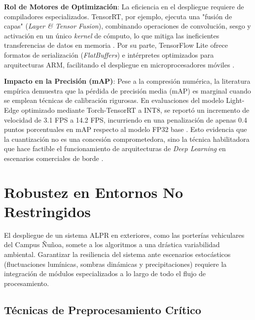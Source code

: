 \textbf{Rol de Motores de Optimización}: 
La eficiencia en el despliegue requiere de compiladores especializados. 
TensorRT, por ejemplo, ejecuta una "fusión de capas" (\textit{Layer \& Tensor Fusion}), 
combinando operaciones de convolución, sesgo y activación en un único \textit{kernel} de 
cómputo, lo que mitiga las ineficientes transferencias de datos en memoria 
\parencite{ammarMultiStageDeepLearningBasedVehicle2023, sonnaraEfficientRealtimeLicense2025}. 
Por su parte, TensorFlow Lite ofrece formatos de serialización (\textit{FlatBuffers}) e 
intérpretes optimizados para arquitecturas ARM, facilitando el despliegue en microprocesadores 
móviles \parencite{swatiEfficientDeepLearning2024}.

\textbf{Impacto en la Precisión (mAP)}: 
Pese a la compresión numérica, la literatura empírica demuestra que la pérdida de 
precisión media (mAP) es marginal cuando se emplean técnicas de calibración rigurosas. 
En evaluaciones del modelo Light-Edge optimizado mediante Torch-TensorRT a INT8, se 
reportó un incremento de velocidad de 3.1 FPS a 14.2 FPS, incurriendo en una penalización 
de apenas 0.4 puntos porcentuales en mAP respecto al modelo FP32 base 
\parencite{sonnaraEfficientRealtimeLicense2025}. 
Esto evidencia que la cuantización no es una concesión comprometedora, sino la técnica 
habilitadora que hace factible el funcionamiento de arquitecturas de \textit{Deep Learning} 
en escenarios comerciales de borde 
\parencite{sonnaraEfficientRealtimeLicense2025, swatiEfficientDeepLearning2024}.


\section{Robustez en Entornos No Restringidos}

El despliegue de un sistema ALPR en exteriores, como las porterías vehiculares del 
Campus Ñuñoa, somete a los algoritmos a una drástica variabilidad ambiental. 
Garantizar la resiliencia del sistema ante escenarios estocásticos (fluctuaciones 
lumínicas, sombras dinámicas y precipitaciones) requiere la integración de módulos 
especializados a lo largo de todo el flujo de procesamiento.

\subsection{Técnicas de Preprocesamiento Crítico}

